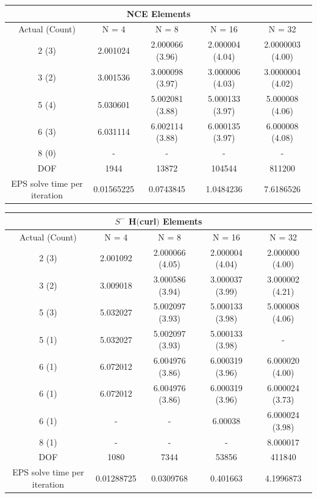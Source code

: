 \documentclass[format=acmsmall,screen,timestamp=false,a4paper]{acmart}
\begin{document}
\begin{table}[htbp]
  \centering
\begin{tabular}{ c c c c c }
\multicolumn{5}{c}{NCE Elements} \\
\hline
Actual (Count) & N = 4 & N = 8 & N = 16 & N = 32 \\ 
\hline
2 (3) &2.001024 & 2.000066 (3.96) & 2.000004 (4.04) & 2.0000003 (4.00) \\  
3 (2) & 3.001536 & 3.000098 (3.97) & 3.000006 (4.03) & 3.0000004 (4.02) \\
5 (4) & 5.030601 & 5.002081 (3.88)& 5.000133 (3.97) & 5.000008 (4.06) \\
6 (3) & 6.031114 & 6.002114 (3.88) & 6.000135 (3.97) &  6.000008 (4.08) \\
8 (0) & - & -& - & - \\
\hline
DOF  & 1944 & 13872 & 104544 & 811200 \\
\hline
EPS solve time per iteration & 0.01565225 & 0.0743845 & 1.0484236 & 7.6186526 \\
\hline
\end{tabular}

\vspace{1em}

\begin{tabular}{ c c c c c }
\multicolumn{5}{c}{$S^-$ H$($curl$)$ Elements} \\
\hline
Actual (Count) & N = 4 & N = 8 & N = 16 & N = 32 \\ 
\hline
2 (3) & 2.001092 & 2.000066 (4.05) & 2.000004 (4.04) & 2.000000 (4.00) \\  
3 (2) & 3.009018 & 3.000586 (3.94) & 3.000037 (3.99) & 3.000002 (4.21) \\
5 (3) & 5.032027 & 5.002097 (3.93)& 5.000133 (3.98) & 5.000008 (4.06) \\
5 (1) & 5.032027 & 5.002097 (3.93) & 5.000133 (3.98) & - \\
6 (1) & 6.072012 & 6.004976 (3.86) & 6.000319 (3.96) & 6.000020 (4.00) \\
6 (1) & 6.072012 & 6.004976 (3.86) & 6.000319 (3.96) & 6.000024 (3.73)\\
6 (1) & - & - & 6.00038 & 6.000024 (3.98)\\
8 (1) & - & - & - & 8.000017 \\
\hline
DOF  & 1080 & 7344 & 53856 & 411840 \\
\hline
EPS solve time per iteration & 0.01288725 & 0.0309768 & 0.401663 & 4.1996873 \\
\hline
\end{tabular}
\vspace{0.5em}


\end{table}
\end{document}
